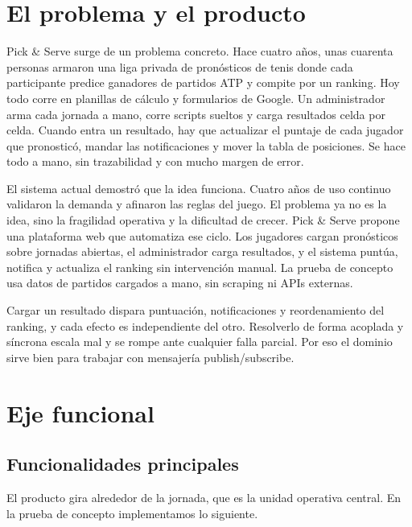 
\section{El problema y el producto}

Pick \& Serve surge de un problema concreto. Hace cuatro años, unas cuarenta personas armaron una liga privada de pronósticos de tenis donde cada participante predice ganadores de partidos ATP y compite por un ranking. Hoy todo corre en planillas de cálculo y formularios de Google. Un administrador arma cada jornada a mano, corre scripts sueltos y carga resultados celda por celda. Cuando entra un resultado, hay que actualizar el puntaje de cada jugador que pronosticó, mandar las notificaciones y mover la tabla de posiciones. Se hace todo a mano, sin trazabilidad y con mucho margen de error.

El sistema actual demostró que la idea funciona. Cuatro años de uso continuo validaron la demanda y afinaron las reglas del juego. El problema ya no es la idea, sino la fragilidad operativa y la dificultad de crecer. Pick \& Serve propone una plataforma web que automatiza ese ciclo. Los jugadores cargan pronósticos sobre jornadas abiertas, el administrador carga resultados, y el sistema puntúa, notifica y actualiza el ranking sin intervención manual. La prueba de concepto usa datos de partidos cargados a mano, sin scraping ni APIs externas.

Cargar un resultado dispara puntuación, notificaciones y reordenamiento del ranking, y cada efecto es independiente del otro. Resolverlo de forma acoplada y síncrona escala mal y se rompe ante cualquier falla parcial. Por eso el dominio sirve bien para trabajar con mensajería publish/subscribe.

\section{Eje funcional}

\subsection{Funcionalidades principales}

El producto gira alrededor de la jornada, que es la unidad operativa central. En la prueba de concepto implementamos lo siguiente.

